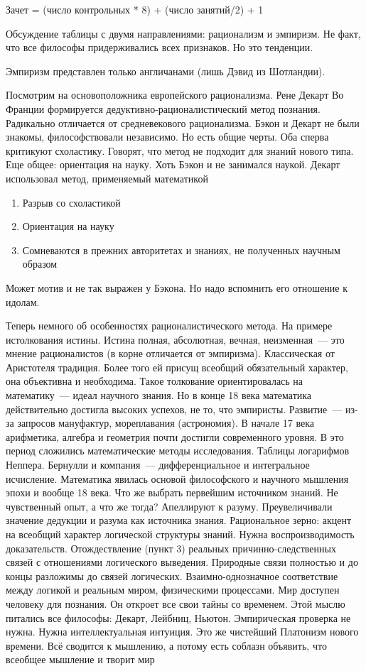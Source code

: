 Зачет = (число контрольных * 8) + (число занятий/2) + 1

Обсуждение таблицы с двумя направлениями: рационализм и эмпиризм. Не факт, что все философы придерживались всех признаков. Но это тенденции.

Эмпиризм представлен только англичанами (лишь Дэвид из Шотландии). 

Посмотрим на основоположника европейского рационализма. Рене Декарт
Во Франции формируется дедуктивно-рационалистический метод познания. Радикально отличается от средневекового рационализма. Бэкон и Декарт не были знакомы, философствовали независимо. Но есть общие черты. Оба сперва критикуют схоластику. Говорят, что метод не подходит для знаний нового типа. Еще общее: ориентация на науку. Хоть Бэкон и не занимался наукой. Декарт использовал метод, применяемый математикой

\begin{enumerate}
	\item Разрыв со схоластикой
	\item Ориентация на науку
	\item Сомневаются в прежних авторитетах и знаниях, не полученных научным образом
\end{enumerate}
Может мотив и не так выражен у Бэкона. Но надо вспомнить его отношение к идолам.

Теперь немного об особенностях рационалистического метода. На примере истолкования истины.
Истина полная, абсолютная, вечная, неизменная~--- это мнение рационалистов (в корне отличается от эмпиризма). Классическая от Аристотеля традиция. Более того ей присущ всеобщий обязательный характер, она объективна и необходима. Такое толкование ориентировалась на математику~--- идеал научного знания. Но в конце 18 века математика действительно достигла высоких успехов, не то, что эмпиристы. Развитие~--- из-за запросов мануфактур, мореплавания (астрономия). В начале 17 века арифметика, алгебра и геометрия почти достигли современного уровня. В это период сложились математические методы исследования. Таблицы логарифмов Неппера. Бернулли и компания~--- дифференциальное и интегральное исчисление. Математика явилась основой философского и научного мышления эпохи и вообще 18 века. Что же выбрать первейшим источником знаний. Не чувственный опыт, а что же тогда? Апеллируют к разуму. Преувеличивали значение дедукции и разума как источника знания. Рациональное зерно: акцент на всеобщий характер логической структуры знаний. Нужна воспроизводимость доказательств. 
Отождествление (пункт 3) реальных причинно-следственных связей с отношениями логического выведения. Природные связи полностью и до концы разложимы до связей логических. Взаимно-однозначное соответствие между логикой и реальным миром, физическими процессами. Мир доступен человеку для познания. Он откроет все свои тайны со временем. Этой мыслю питались все философы: Декарт, Лейбниц, Ньютон. Эмпирическая проверка не нужна. Нужна интеллектуальная интуиция. Это же чистейший Платонизм нового времени. Всё сводится к мышлению, а потому есть соблазн объявить, что всеобщее мышление и творит мир

